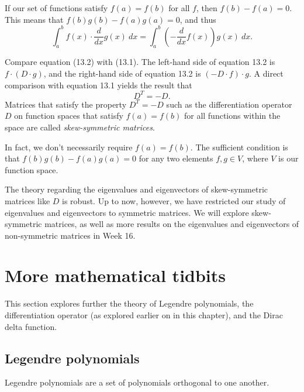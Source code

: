 \documentclass[a4paper, 12pt,oneside,openany]{book}
\begin{document}
If our set of functions satisfy $f(a)=f(b)$ for all $f$, then $f(b)-f(a)=0$. This means that $f(b)g(b)-f(a)g(a)=0$, and thus \begin{equation}\int_a^b f(x) \cdot \frac{d}{dx} g(x)\ dx = \int_a^b \left(-\frac{d}{dx} f(x)\right) g(x)\ dx. \end{equation}

Compare equation (13.2) with (13.1). The left-hand side of equation 13.2 is $f \cdot (D\cdot g)$, and the right-hand side of equation 13.2 is $(-D\cdot f)\cdot g$. A direct comparison with equation 13.1 yields the result that $$D^T = -D.$$ Matrices that satisfy the property $D^T=-D$ such as the differentiation operator $D$ on function spaces that satisfy $f(a)=f(b)$ for all functions within the space are called \emph{skew-symmetric matrices}. 

In fact, we don't necessarily require $f(a)=f(b)$. The sufficient condition is that $f(b)g(b) - f(a)g(a)=0$ for any two elements $f, g \in V$, where $V$ is our function space.

The theory regarding the eigenvalues and eigenvectors of skew-symmetric matrices like $D$ is robust. Up to now, however, we have restricted our study of eigenvalues and eigenvectors to symmetric matrices. We will explore skew-symmetric matrices, as well as more results on the eigenvalues and eigenvectors of non-symmetric matrices in Week 16. 

\section{More mathematical tidbits}

This section explores further the theory of Legendre polynomials, the differentiation operator (as explored earlier on in this chapter), and the Dirac delta function. 

\subsection{Legendre polynomials}
Legendre polynomials are a set of polynomials orthogonal to one another. 

\end{document}
